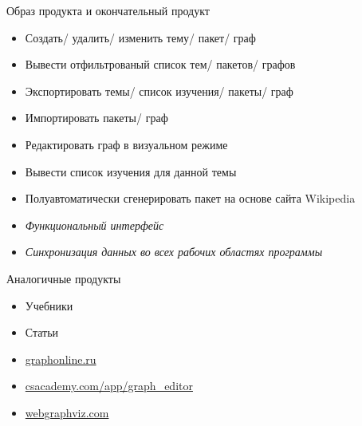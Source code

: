 \begin{frame}{Образ продукта и окончательный продукт}
    \begin{itemize}
        \item<1-> Создать/ удалить/ изменить тему/ пакет/ граф
        \item<2-> Вывести отфильтрованый список тем/ пакетов/ графов %
        \item<3-> Экспортировать темы/ список изучения/ пакеты/ граф
        \item<3-> Импортировать пакеты/ граф
        \item<4-> {\color{blue}Редактировать граф в визуальном режиме}
        \item<5-> Вывести список изучения для данной темы
        \item<6-> {\color{blue}Полу}автоматически сгенерировать пакет на основе сайта Wikipedia
        \item<7-> \textit{Функциональный интерфейс}
        \item<8-> \textit{Синхронизация данных во всех рабочих областях программы}
    \end{itemize}
\end{frame}

\begin{frame}{Аналогичные продукты}
    \begin{itemize}
        \item<1-> Учебники %
        \item<2-> Статьи %
        \item<3-> \url{graphonline.ru} %
        \item<3-> \url{csacademy.com/app/graph\_editor} %
        \item<3-> \url{webgraphviz.com} %
    \end{itemize}
\end{frame}

